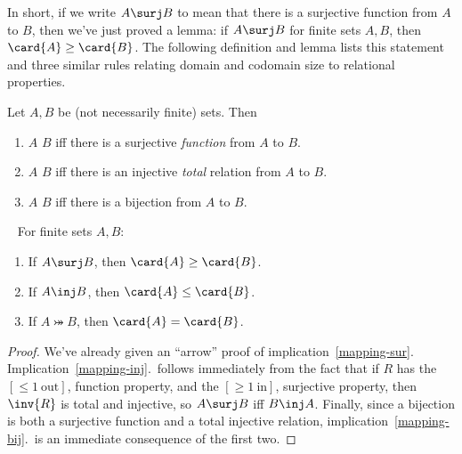 In short, if we write $A \surj B$ to mean that there is a surjective
function from $A$ to $B$, then we've just proved a lemma: if $A \surj
B$ for finite sets $A,B$, then $\card{A} \geq \card{B}$.  The
following definition and lemma lists this statement and three similar
rules relating domain and codomain size to relational properties.

\begin{definition}\label{bigger}
  Let $A,B$ be (not necessarily finite) sets.  Then
  \begin{enumerate}
  \item $A$ \term{$\surj$} $B$ iff there is a surjective
    \emph{function} from $A$ to $B$.

  \item $A$ \term{$\inj$} $B$ iff there is an injective
    \emph{total} relation from $A$ to $B$.

  \item $A$ \term{$\bij$} $B$ iff there is a bijection from $A$ to
    $B$.

  \end{enumerate}
\end{definition}

\begin{lemma}\label{maprule_implies}  \mbox{ }
For finite sets $A,B$:

\begin{enumerate}

\item\label{mapping-sur} If $A \surj B$, then $\card{A} \geq
  \card{B}$.

\item\label{mapping-inj} If $A \inj B$, then $\card{A} \leq \card{B}$.

\item\label{mapping-bij} If $A \bij B$, then $\card{A} = \card{B}$.
\end{enumerate}

\end{lemma}

\begin{proof}
 We've already given an ``arrow'' proof of
 implication~\ref{mapping-sur}.
 Implication~\ref{mapping-inj}.\ follows immediately from the fact
 that if $R$ has the $[\le 1\ \text{out}]$, function property, and the
 $[\ge 1\ \text{in}]$, surjective property, then $\inv{R}$ is total
 and injective, so $A \surj B$ iff $B \inj A$.  Finally, since a
 bijection is both a surjective function and a total injective
 relation, implication~\ref{mapping-bij}.\ is an immediate consequence
 of the first two.
\end{proof}

